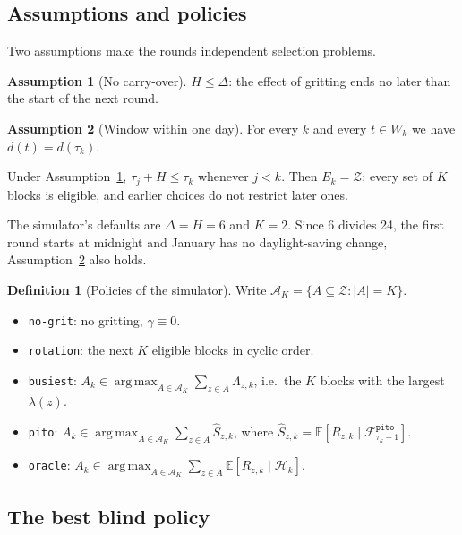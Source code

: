 \documentclass[11pt,a4paper]{article}
\theoremstyle{plain}
\theoremstyle{definition}
\newtheorem{maaritelma}{Definition}
\newtheorem{oletus}{Assumption}
\theoremstyle{remark}
\newcommand{\E}{\mathbb{E}}
\newcommand{\cZ}{\mathcal{Z}}
\newcommand{\cF}{\mathcal{F}}
\newcommand{\cH}{\mathcal{H}}
\newcommand{\cA}{\mathcal{A}}
\newcommand{\1}{\mathbf{1}}
\newcommand{\pol}[1]{\texttt{#1}}
\DeclareMathOperator*{\argmax}{arg\,max}
\begin{document}
\subsection{Assumptions and policies}

Two assumptions make the rounds independent selection problems.

\begin{oletus}[No carry-over]\label{ol:A}
$H \le \Delta$: the effect of gritting ends no later than the start of the next round.
\end{oletus}

\begin{oletus}[Window within one day]\label{ol:B}
For every $k$ and every $t \in W_k$ we have $d(t) = d(\tau_k)$.
\end{oletus}

Under Assumption~\ref{ol:A}, $\tau_j + H \le \tau_k$ whenever $j < k$. Then
$E_k = \cZ$: every set of $K$ blocks is eligible, and earlier choices do not
restrict later ones.

The simulator's defaults are $\Delta = H = 6$ and $K = 2$. Since 6 divides 24,
the first round starts at midnight and January has no daylight-saving change,
Assumption~\ref{ol:B} also holds.

\begin{maaritelma}[Policies of the simulator]\label{maar:koodi}
Write $\cA_K = \{A \subseteq \cZ : |A| = K\}$.
\begin{itemize}
  \item \pol{no-grit}: no gritting, $\gamma \equiv 0$.
  \item \pol{rotation}: the next $K$ eligible blocks in cyclic order.
  \item \pol{busiest}: $A_k \in \argmax_{A \in \cA_K} \sum_{z \in A} \Lambda_{z,k}$,
  i.e.\ the $K$ blocks with the largest $\lambda(z)$.
  \item \pol{pito}: $A_k \in \argmax_{A \in \cA_K} \sum_{z \in A} \hat S_{z,k}$,
  where $\hat S_{z,k} = \E[R_{z,k} \mid \cF^{\pol{pito}}_{\tau_k - 1}]$.
  \item \pol{oracle}: $A_k \in \argmax_{A \in \cA_K} \sum_{z \in A} \E[R_{z,k} \mid \cH_k]$.
\end{itemize}
\end{maaritelma}

\subsection{The best blind policy}
\end{document}
